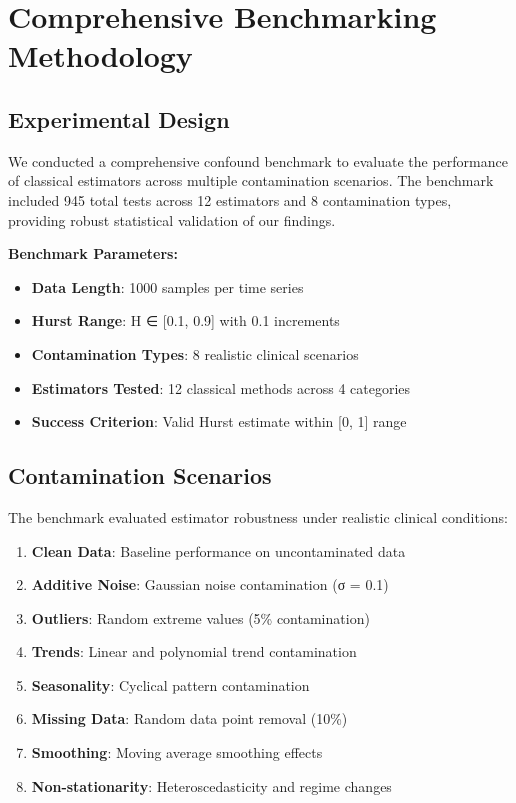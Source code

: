 \section{Comprehensive Benchmarking Methodology}

\subsection{Experimental Design}

We conducted a comprehensive confound benchmark to evaluate the performance of classical estimators across multiple contamination scenarios. The benchmark included 945 total tests across 12 estimators and 8 contamination types, providing robust statistical validation of our findings.

\textbf{Benchmark Parameters:}
\begin{itemize}
    \item \textbf{Data Length}: 1000 samples per time series
    \item \textbf{Hurst Range}: H ∈ [0.1, 0.9] with 0.1 increments
    \item \textbf{Contamination Types}: 8 realistic clinical scenarios
    \item \textbf{Estimators Tested}: 12 classical methods across 4 categories
    \item \textbf{Success Criterion}: Valid Hurst estimate within [0, 1] range
\end{itemize}

\subsection{Contamination Scenarios}

The benchmark evaluated estimator robustness under realistic clinical conditions:

\begin{enumerate}
    \item \textbf{Clean Data}: Baseline performance on uncontaminated data
    \item \textbf{Additive Noise}: Gaussian noise contamination (σ = 0.1)
    \item \textbf{Outliers}: Random extreme values (5\% contamination)
    \item \textbf{Trends}: Linear and polynomial trend contamination
    \item \textbf{Seasonality}: Cyclical pattern contamination
    \item \textbf{Missing Data}: Random data point removal (10\%)
    \item \textbf{Smoothing}: Moving average smoothing effects
    \item \textbf{Non-stationarity}: Heteroscedasticity and regime changes
\end{enumerate}

